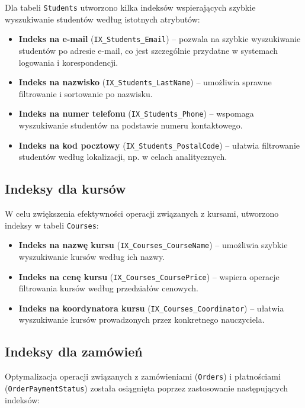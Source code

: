 \documentclass[12pt]{article}
\begin{document}
\noindent Dla tabeli \texttt{Students} utworzono kilka indeksów wspierających szybkie wyszukiwanie studentów według istotnych atrybutów:

\begin{itemize}
    \item \textbf{Indeks na e-mail} (\texttt{IX\_Students\_Email}) -- pozwala na szybkie wyszukiwanie studentów po adresie e-mail, co jest szczególnie przydatne w systemach logowania i korespondencji.
    \item \textbf{Indeks na nazwisko} (\texttt{IX\_Students\_LastName}) -- umożliwia sprawne filtrowanie i sortowanie po nazwisku.
    \item \textbf{Indeks na numer telefonu} (\texttt{IX\_Students\_Phone}) -- wspomaga wyszukiwanie studentów na podstawie numeru kontaktowego.
    \item \textbf{Indeks na kod pocztowy} (\texttt{IX\_Students\_PostalCode}) -- ułatwia filtrowanie studentów według lokalizacji, np. w celach analitycznych.
\end{itemize}

\subsection{Indeksy dla kursów}

\noindent W celu zwiększenia efektywności operacji związanych z kursami, utworzono indeksy w tabeli \texttt{Courses}:

\begin{itemize}
    \item \textbf{Indeks na nazwę kursu} (\texttt{IX\_Courses\_CourseName}) -- umożliwia szybkie wyszukiwanie kursów według ich nazwy.
    \item \textbf{Indeks na cenę kursu} (\texttt{IX\_Courses\_CoursePrice}) -- wspiera operacje filtrowania kursów według przedziałów cenowych.
    \item \textbf{Indeks na koordynatora kursu} (\texttt{IX\_Courses\_Coordinator}) -- ułatwia wyszukiwanie kursów prowadzonych przez konkretnego nauczyciela.
\end{itemize}

\subsection{Indeksy dla zamówień}

\noindent Optymalizacja operacji związanych z zamówieniami (\texttt{Orders}) i płatnościami (\texttt{OrderPaymentStatus}) została osiągnięta poprzez zastosowanie następujących indeksów:
\end{document}
